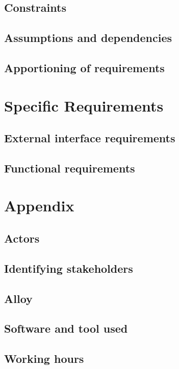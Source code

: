\documentclass[]{report}
\begin{document}
\section{Constraints}


\section{Assumptions and dependencies}


\section{Apportioning of requirements}


\chapter{Specific Requirements}

\section{External interface requirements}


\section{Functional requirements}




\appendix

\chapter{Appendix}

\section{Actors}


\section{Identifying stakeholders}


\section{Alloy}


\section{Software and tool used}


\section{Working hours}

\end{document}
